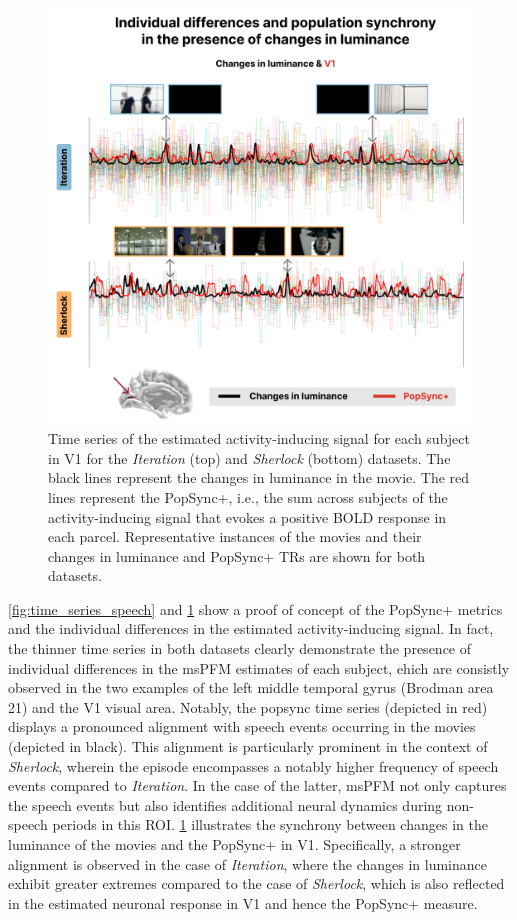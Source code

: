\begin{figure}[!ht]
\centering
\includegraphics[width=0.9\linewidth]{figures/multi_subject/time_luminance.png}
\caption[]{Time series of the estimated activity-inducing signal for each
subject in V1 for the \textit{Iteration} (top) and \textit{Sherlock} (bottom)
datasets. The black lines represent the changes in luminance in the movie. The
red lines represent the PopSync+, i.e., the sum across subjects of the
activity-inducing signal that evokes a positive BOLD response in each parcel.
Representative instances of the movies and their changes in luminance and
PopSync+ TRs are shown for both datasets.}
\label{fig:time_series_luminance}
\end{figure}

\cref{fig:time_series_speech} and \cref{fig:time_series_luminance} show a proof
of concept of the PopSync+ metrics and the individual differences in the
estimated activity-inducing signal. In fact, the thinner time series in both
datasets clearly demonstrate the presence of individual differences in the msPFM
estimates of each subject, ehich are consistly observed in the two examples of
the left middle temporal gyrus (Brodman area 21) and the V1 visual area.
Notably, the \acrshort*{popsync} time series (depicted in red) displays a
pronounced alignment with speech events occurring in the movies (depicted in
black). This alignment is particularly prominent in the context of
\textit{Sherlock}, wherein the episode encompasses a notably higher frequency of
speech events compared to \textit{Iteration}. In the case of the latter, msPFM
not only captures the speech events but also identifies additional neural
dynamics during non-speech periods in this ROI. \cref{fig:time_series_luminance}
illustrates the synchrony between changes in the luminance of the movies and the
PopSync+ in V1. Specifically, a stronger alignment is observed in the case of
\textit{Iteration}, where the changes in luminance exhibit greater extremes
compared to the case of \textit{Sherlock}, which is also reflected in the
estimated neuronal response in V1 and hence the PopSync+ measure.

